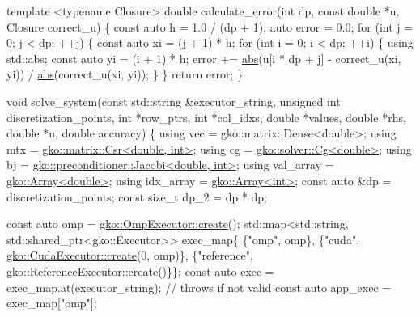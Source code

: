 {\begin{DoxyCodeInclude}
\textcolor{keyword}{template} <\textcolor{keyword}{typename} Closure>
\textcolor{keywordtype}{double} calculate\_error(\textcolor{keywordtype}{int} dp, \textcolor{keyword}{const} \textcolor{keywordtype}{double} *u, Closure correct\_u)
\{
    \textcolor{keyword}{const} \textcolor{keyword}{auto} h = 1.0 / (dp + 1);
    \textcolor{keyword}{auto} error = 0.0;
    \textcolor{keywordflow}{for} (\textcolor{keywordtype}{int} j = 0; j < dp; ++j) \{
        \textcolor{keyword}{const} \textcolor{keyword}{auto} xi = (j + 1) * h;
        \textcolor{keywordflow}{for} (\textcolor{keywordtype}{int} i = 0; i < dp; ++i) \{
            \textcolor{keyword}{using} std::abs;
            \textcolor{keyword}{const} \textcolor{keyword}{auto} yi = (i + 1) * h;
            error +=
                \hyperlink{namespacegko_a57797fc0a00fd4b7ff34ca4bfc84bc51}{abs}(u[i * dp + j] - correct\_u(xi, yi)) / \hyperlink{namespacegko_a57797fc0a00fd4b7ff34ca4bfc84bc51}{abs}(correct\_u(xi, yi));
        \}
    \}
    \textcolor{keywordflow}{return} error;
\}


\textcolor{keywordtype}{void} solve\_system(\textcolor{keyword}{const} std::string &executor\_string,
                  \textcolor{keywordtype}{unsigned} \textcolor{keywordtype}{int} discretization\_points, \textcolor{keywordtype}{int} *row\_ptrs,
                  \textcolor{keywordtype}{int} *col\_idxs, \textcolor{keywordtype}{double} *values, \textcolor{keywordtype}{double} *rhs, \textcolor{keywordtype}{double} *u,
                  \textcolor{keywordtype}{double} accuracy)
\{
    \textcolor{keyword}{using} vec = gko::matrix::Dense<double>;
    \textcolor{keyword}{using} mtx = \hyperlink{classgko_1_1matrix_1_1Csr}{gko::matrix::Csr<double, int>};
    \textcolor{keyword}{using} cg = \hyperlink{classgko_1_1solver_1_1Cg}{gko::solver::Cg<double>};
    \textcolor{keyword}{using} bj = \hyperlink{classgko_1_1preconditioner_1_1Jacobi}{gko::preconditioner::Jacobi<double, int>};
    \textcolor{keyword}{using} val\_array = \hyperlink{classgko_1_1Array}{gko::Array<double>};
    \textcolor{keyword}{using} idx\_array = \hyperlink{classgko_1_1Array}{gko::Array<int>};
    \textcolor{keyword}{const} \textcolor{keyword}{auto} &dp = discretization\_points;
    \textcolor{keyword}{const} \textcolor{keywordtype}{size\_t} dp\_2 = dp * dp;

    \textcolor{keyword}{const} \textcolor{keyword}{auto} omp = \hyperlink{classgko_1_1OmpExecutor_a33ca05fdd0fc928ee262fc9425304874}{gko::OmpExecutor::create}();
    std::map<std::string, std::shared\_ptr<gko::Executor>> exec\_map\{
        \{\textcolor{stringliteral}{"omp"}, omp\},
        \{\textcolor{stringliteral}{"cuda"}, \hyperlink{classgko_1_1CudaExecutor_a2718a92034350650ef406ffdb60db090}{gko::CudaExecutor::create}(0, omp)\},
        \{\textcolor{stringliteral}{"reference"}, gko::ReferenceExecutor::create()\}\};
    \textcolor{keyword}{const} \textcolor{keyword}{auto} exec = exec\_map.at(executor\_string);  \textcolor{comment}{// throws if not valid}
    \textcolor{keyword}{const} \textcolor{keyword}{auto} app\_exec = exec\_map[\textcolor{stringliteral}{"omp"}];



\end{DoxyCodeInclude}}
